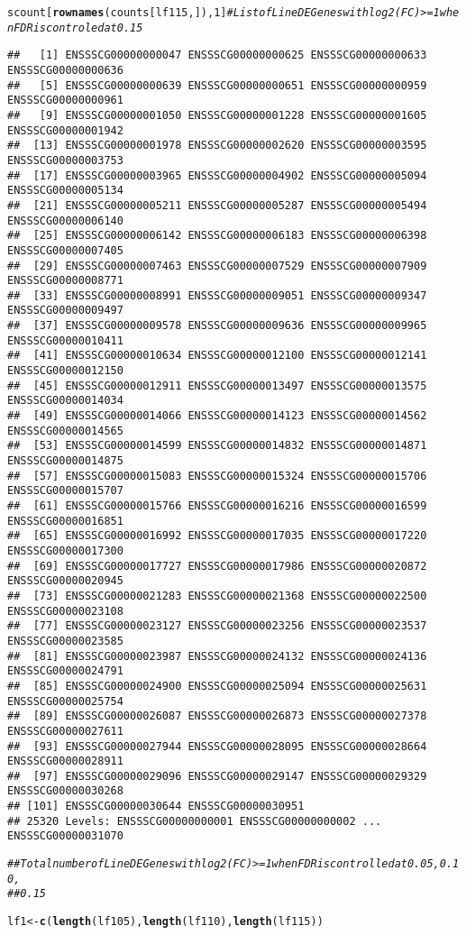 \documentclass{article}\usepackage[]{graphicx}\usepackage[]{color}
\makeatletter
\newcommand{\hlnum}[1]{\textcolor[rgb]{0.686,0.059,0.569}{#1}}%
\newcommand{\hlcom}[1]{\textcolor[rgb]{0.678,0.584,0.686}{\textit{#1}}}%
\newcommand{\hlstd}[1]{\textcolor[rgb]{0.345,0.345,0.345}{#1}}%
\newcommand{\hlkwb}[1]{\textcolor[rgb]{0.69,0.353,0.396}{#1}}%
\newcommand{\hlkwd}[1]{\textcolor[rgb]{0.737,0.353,0.396}{\textbf{#1}}}%
\newenvironment{kframe}{%
 \def\at@end@of@kframe{}%
 \ifinner\ifhmode%
  \def\at@end@of@kframe{\end{minipage}}%
  \begin{minipage}{\columnwidth}%
 \fi\fi%
 \def\FrameCommand##1{\hskip\@totalleftmargin \hskip-\fboxsep
 \colorbox{shadecolor}{##1}\hskip-\fboxsep
     \hskip-\linewidth \hskip-\@totalleftmargin \hskip\columnwidth}%
 \MakeFramed {\advance\hsize-\width
   \@totalleftmargin\z@ \linewidth\hsize
   \@setminipage}}%
 {\par\unskip\endMakeFramed%
 \at@end@of@kframe}
\newenvironment{knitrout}{}{} %
\makeatother
\begin{document}
\begin{knitrout}
\begin{kframe}
\begin{alltt}
\hlstd{scount[}\hlkwd{rownames}\hlstd{(counts[lf115, ]),} \hlnum{1}\hlstd{]}  \hlcom{# List of  Line DE Genes with log2(FC) >=1 when FDR is controled at 0.15}
\end{alltt}
\begin{verbatim}
##   [1] ENSSSCG00000000047 ENSSSCG00000000625 ENSSSCG00000000633 ENSSSCG00000000636
##   [5] ENSSSCG00000000639 ENSSSCG00000000651 ENSSSCG00000000959 ENSSSCG00000000961
##   [9] ENSSSCG00000001050 ENSSSCG00000001228 ENSSSCG00000001605 ENSSSCG00000001942
##  [13] ENSSSCG00000001978 ENSSSCG00000002620 ENSSSCG00000003595 ENSSSCG00000003753
##  [17] ENSSSCG00000003965 ENSSSCG00000004902 ENSSSCG00000005094 ENSSSCG00000005134
##  [21] ENSSSCG00000005211 ENSSSCG00000005287 ENSSSCG00000005494 ENSSSCG00000006140
##  [25] ENSSSCG00000006142 ENSSSCG00000006183 ENSSSCG00000006398 ENSSSCG00000007405
##  [29] ENSSSCG00000007463 ENSSSCG00000007529 ENSSSCG00000007909 ENSSSCG00000008771
##  [33] ENSSSCG00000008991 ENSSSCG00000009051 ENSSSCG00000009347 ENSSSCG00000009497
##  [37] ENSSSCG00000009578 ENSSSCG00000009636 ENSSSCG00000009965 ENSSSCG00000010411
##  [41] ENSSSCG00000010634 ENSSSCG00000012100 ENSSSCG00000012141 ENSSSCG00000012150
##  [45] ENSSSCG00000012911 ENSSSCG00000013497 ENSSSCG00000013575 ENSSSCG00000014034
##  [49] ENSSSCG00000014066 ENSSSCG00000014123 ENSSSCG00000014562 ENSSSCG00000014565
##  [53] ENSSSCG00000014599 ENSSSCG00000014832 ENSSSCG00000014871 ENSSSCG00000014875
##  [57] ENSSSCG00000015083 ENSSSCG00000015324 ENSSSCG00000015706 ENSSSCG00000015707
##  [61] ENSSSCG00000015766 ENSSSCG00000016216 ENSSSCG00000016599 ENSSSCG00000016851
##  [65] ENSSSCG00000016992 ENSSSCG00000017035 ENSSSCG00000017220 ENSSSCG00000017300
##  [69] ENSSSCG00000017727 ENSSSCG00000017986 ENSSSCG00000020872 ENSSSCG00000020945
##  [73] ENSSSCG00000021283 ENSSSCG00000021368 ENSSSCG00000022500 ENSSSCG00000023108
##  [77] ENSSSCG00000023127 ENSSSCG00000023256 ENSSSCG00000023537 ENSSSCG00000023585
##  [81] ENSSSCG00000023987 ENSSSCG00000024132 ENSSSCG00000024136 ENSSSCG00000024791
##  [85] ENSSSCG00000024900 ENSSSCG00000025094 ENSSSCG00000025631 ENSSSCG00000025754
##  [89] ENSSSCG00000026087 ENSSSCG00000026873 ENSSSCG00000027378 ENSSSCG00000027611
##  [93] ENSSSCG00000027944 ENSSSCG00000028095 ENSSSCG00000028664 ENSSSCG00000028911
##  [97] ENSSSCG00000029096 ENSSSCG00000029147 ENSSSCG00000029329 ENSSSCG00000030268
## [101] ENSSSCG00000030644 ENSSSCG00000030951
## 25320 Levels: ENSSSCG00000000001 ENSSSCG00000000002 ... ENSSSCG00000031070
\end{verbatim}
\begin{alltt}
\hlcom{## Total number of Line DE Genes with log2(FC) >=1 when FDR is controlled at 0.05, 0.10,}
\hlcom{## 0.15}

\hlstd{lf1} \hlkwb{<-} \hlkwd{c}\hlstd{(}\hlkwd{length}\hlstd{(lf105),} \hlkwd{length}\hlstd{(lf110),} \hlkwd{length}\hlstd{(lf115))}
\end{alltt}
\end{kframe}
\end{knitrout}
\end{document}
